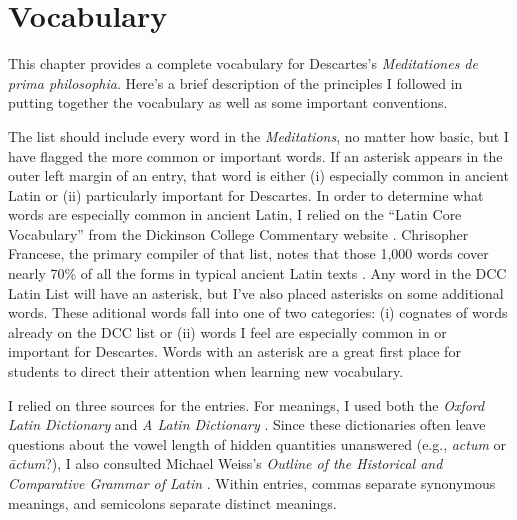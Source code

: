 \chapter{Vocabulary}

This chapter provides a complete vocabulary for Descartes's \textit{Meditationes de prima philosophia}. Here's a brief description of the principles I followed in putting together the vocabulary as well as some important conventions.

The list should include every word in the \textit{Meditations}, no matter how basic, but I have flagged the more common or important words. If an asterisk appears in the outer left margin of an entry, that word is either (i) especially common in ancient Latin or (ii) particularly important for Descartes. In order to determine what words are especially common in ancient Latin, I relied on the ``Latin Core Vocabulary'' from the Dickinson College Commentary website \parencite{cfrancese2014}. Chrisopher Francese, the primary compiler of that list, notes that those 1,000 words cover nearly 70\% of all the forms in typical ancient Latin texts \parencite{cfrancese2013}. Any word in the DCC Latin List will have an asterisk, but I've also placed asterisks on some additional words. These aditional words fall into one of two categories: (i) cognates of words already on the DCC list or (ii) words I feel are especially common in or important for Descartes. Words with an asterisk are a great first place for students to direct their attention when learning new vocabulary.

I relied on three sources for the entries. For meanings, I used both the \textit{Oxford Latin Dictionary} and \textit{A Latin Dictionary} \parencite{old1982,lewisshort}. Since these dictionaries often leave questions about the vowel length of hidden quantities unanswered (e.g., \textit{actum} or \textit{āctum}?), I also consulted Michael Weiss's \textit{Outline of the Historical and Comparative Grammar of Latin} \parencite{weiss2011}. Within entries, commas separate synonymous meanings, and semicolons separate distinct meanings.
\clearpage

